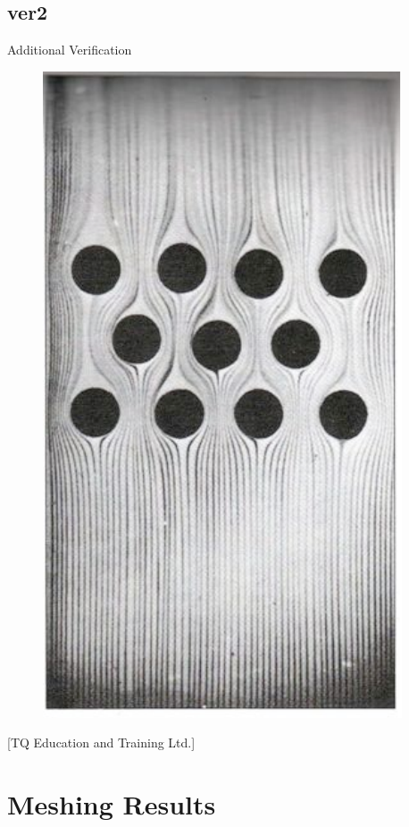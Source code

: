 \documentclass[compress]{beamer}
\begin{document}
\subsection{ver2}
\begin{frame}{Additional Verification}
\begin{figure}
\includegraphics[width=.3\textwidth]{cylinders.pdf}
\end{figure}
{\tiny[TQ Education and Training Ltd.]}
\end{frame}

\section{Meshing Results}
\end{document}
